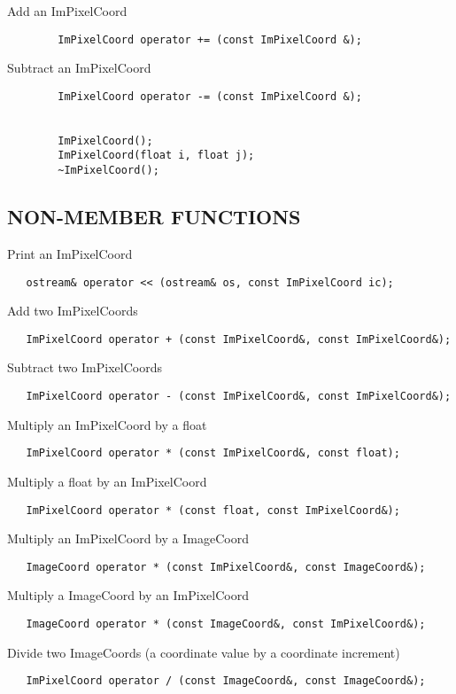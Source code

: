          Add an ImPixelCoord
\begin{verbatim}
        ImPixelCoord operator += (const ImPixelCoord &);
\end{verbatim}

         Subtract an ImPixelCoord
\begin{verbatim}
        ImPixelCoord operator -= (const ImPixelCoord &);


        ImPixelCoord();
        ImPixelCoord(float i, float j);
        ~ImPixelCoord();
\end{verbatim}

\subsection*{NON-MEMBER FUNCTIONS}

 Print an ImPixelCoord
\begin{verbatim}
   ostream& operator << (ostream& os, const ImPixelCoord ic);
\end{verbatim}

 Add two ImPixelCoords
\begin{verbatim}
   ImPixelCoord operator + (const ImPixelCoord&, const ImPixelCoord&);
\end{verbatim}

 Subtract two ImPixelCoords
\begin{verbatim}
   ImPixelCoord operator - (const ImPixelCoord&, const ImPixelCoord&);
\end{verbatim}

 Multiply an ImPixelCoord by a float
\begin{verbatim}
   ImPixelCoord operator * (const ImPixelCoord&, const float);
\end{verbatim}

 Multiply a float by an ImPixelCoord
\begin{verbatim}
   ImPixelCoord operator * (const float, const ImPixelCoord&);
\end{verbatim}

 Multiply an ImPixelCoord by a ImageCoord
\begin{verbatim}
   ImageCoord operator * (const ImPixelCoord&, const ImageCoord&);
\end{verbatim}

 Multiply a ImageCoord by an ImPixelCoord
\begin{verbatim}
   ImageCoord operator * (const ImageCoord&, const ImPixelCoord&);
\end{verbatim}
 Divide two ImageCoords (a coordinate value by a coordinate increment)
\begin{verbatim}
   ImPixelCoord operator / (const ImageCoord&, const ImageCoord&);
\end{verbatim}
